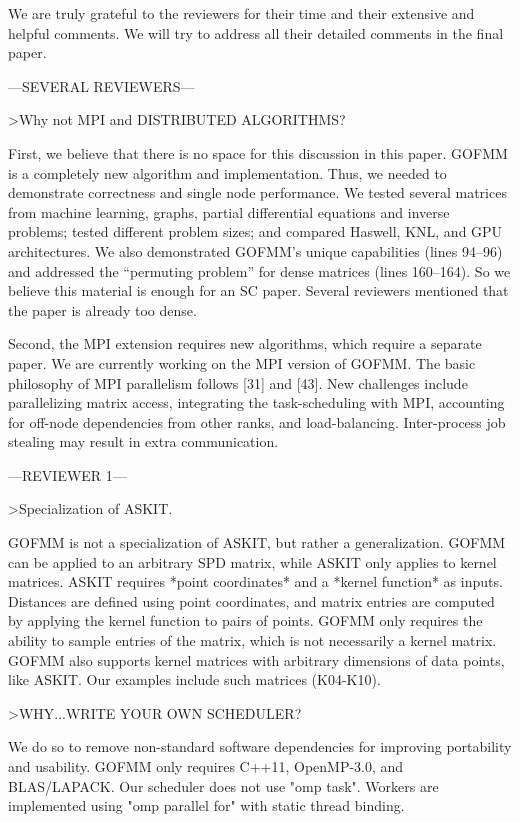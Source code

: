 We are truly grateful to the reviewers for their time and their extensive and helpful comments. We will try to address all their detailed comments in the final paper. 

---SEVERAL REVIEWERS---

>Why not MPI and DISTRIBUTED ALGORITHMS?

First, we believe that there is no space for this discussion in this paper. 
GOFMM is a completely new algorithm and implementation. Thus, we needed to
demonstrate correctness and single node performance. We tested several
matrices from machine learning, graphs, partial differential equations and
inverse problems; tested different problem sizes; and compared 
Haswell, KNL, and GPU architectures. 
We also demonstrated GOFMM's unique capabilities
(lines 94--96) and addressed the ``permuting problem'' for dense matrices (lines 160--164).  
So we believe this material is enough for an SC paper. 
Several reviewers mentioned that the paper is already too dense.

Second, the MPI extension requires new algorithms, which require a separate paper.  We are currently working on the MPI version of GOFMM.   The basic philosophy of MPI parallelism follows [31] and [43].  New challenges include parallelizing matrix access, integrating the task-scheduling with MPI, 
accounting for off-node dependencies from other ranks, and load-balancing. 
Inter-process job stealing may result in extra communication. 

---REVIEWER 1---

>Specialization of ASKIT.

GOFMM is not a specialization of ASKIT, but rather a generalization.
GOFMM can be applied to an arbitrary SPD matrix, while ASKIT only applies to kernel matrices. ASKIT requires *point coordinates* and a *kernel function* as inputs. Distances are defined using point coordinates, and matrix entries are computed by applying the kernel function to pairs of points. GOFMM only requires the ability to sample entries of the matrix, which is not necessarily a kernel matrix. GOFMM also supports kernel matrices with arbitrary dimensions of data points, like ASKIT. Our examples include such matrices (K04-K10).

>WHY...WRITE YOUR OWN SCHEDULER?

We do so to remove non-standard software dependencies for improving portability and usability. 
GOFMM only requires C++11, OpenMP-3.0, and BLAS/LAPACK.
Our scheduler does not use "omp task". Workers are implemented using "omp parallel for" with static thread binding.

